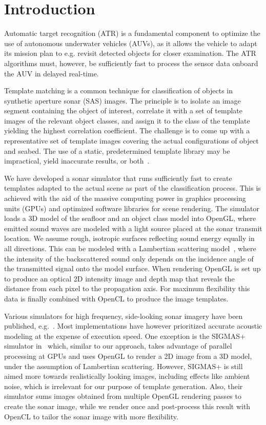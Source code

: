 \documentclass[
   UAM                                          %
 , 12pt                                         %
 , bibtex                                       %
 , layout
]{common/mytemplate}
\begin{document}
\section{Introduction}

Automatic target recognition (ATR) is a fundamental component to optimize the use of autonomous underwater vehicles (AUVs), as it allows the vehicle to adapt its mission plan to e.g. revisit detected objects for closer examination. The ATR algorithms must, however, be sufficiently fast to process the sensor data onboard the AUV in delayed real-time.

Template matching is a common technique for classification of objects in synthetic aperture sonar (SAS) images. The principle is to isolate an image segment containing the object of interest, correlate it with a set of template images of the relevant object classes, and assign it to the class of the template yielding the highest correlation coefficient. The challenge is to come up with a representative set of template images covering the actual configurations of object and seabed. The use of a static, predetermined template library may be impractical, yield inaccurate results, or both~\cite{Midelfart2010}. 

We have developed a sonar simulator that runs sufficiently fast to create templates adapted to the actual scene as part of the classification process. This is achieved with the aid of the massive computing power in graphics processing units (GPUs) and optimized software libraries for scene rendering. The simulator loads a 3D model of the seafloor and an object class model into OpenGL, where emitted sound waves are modeled with a light source placed at the sonar transmit location. We assume rough, isotropic surfaces reflecting sound energy equally in all directions. This can be modeled with a Lambertian scattering model~\cite{Blake1993,Bell1995}, where the intensity of the backscattered sound only depends on the incidence angle of the transmitted signal onto the model surface. When rendering OpenGL is set up to produce an optical 2D intensity image and depth map that reveals the distance from each pixel to the propagation axis. For maximum flexibility this data is finally combined with OpenCL to produce the image templates.

Various simulators for high frequency, side-looking sonar imagery have been published, e.g.~\cite{Bell1997,Sammelmann2004}. Most implementations have however prioritized accurate acoustic modeling at the expense of execution speed. One exception is the SIGMAS+ simulator in~\cite{Coiras2009a, Coiras2009b} which, similar to our approach, takes advantage of parallel processing at GPUs and uses OpenGL to render a 2D image from a 3D model, under the assumption of Lambertian scattering. However, SIGMAS+ is still aimed more towards realistically looking images, including effects like ambient noise, which is irrelevant for our purpose of template generation. Also, their simulator sums images obtained from multiple OpenGL rendering passes to create the sonar image, while we render once and post-process this result with OpenCL to tailor the sonar image with more flexibility.
\end{document}
